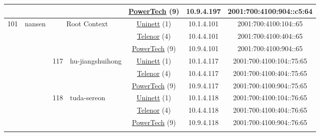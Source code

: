 \begin{small}
\begin{center}
\begin{longtable}{|c|c|c|c|c|c|c|c|}
  &  &  &  & \multicolumn{2}{|c|}{\tiny{\href{http://www.powertech.no}{PowerTech} (9)}} & \tiny{10.9.4.197} & \tiny{2001:700:4100:904::c5:64} \\ \hline
 \multirow{36}{*}{\tiny{101}} & \multicolumn{1}{|l|}{\multirow{36}{*}{\tiny{nansen}}} & \multicolumn{2}{|c|}{\multirow{3}{*}{\tiny{Root Context}}} & \multicolumn{2}{|c|}{\tiny{\href{https://www.uninett.no}{Uninett} (1)}} & \tiny{10.1.4.101} & \tiny{2001:700:4100:104::65} \\* \cline{5-5}\cline{6-6}\cline{7-7}\cline{8-8}
  &  & \multicolumn{2}{|c|}{} & \multicolumn{2}{|c|}{\tiny{\href{https://www.telenor.no}{Telenor} (4)}} & \tiny{10.4.4.101} & \tiny{2001:700:4100:404::65} \\* \cline{5-5}\cline{6-6}\cline{7-7}\cline{8-8}
  &  & \multicolumn{2}{|c|}{} & \multicolumn{2}{|c|}{\tiny{\href{http://www.powertech.no}{PowerTech} (9)}} & \tiny{10.9.4.101} & \tiny{2001:700:4100:904::65} \\* \cline{3-3}\cline{4-4}\cline{5-5}\cline{6-6}\cline{7-7}\cline{8-8}
  &  & \multirow{3}{*}{\tiny{117}} & \multicolumn{1}{|l|}{\multirow{3}{*}{\tiny{hu-jiangshuihong}}} & \multicolumn{2}{|c|}{\tiny{\href{https://www.uninett.no}{Uninett} (1)}} & \tiny{10.1.4.117} & \tiny{2001:700:4100:104::75:65} \\* \cline{5-5}\cline{6-6}\cline{7-7}\cline{8-8}
  &  &  &  & \multicolumn{2}{|c|}{\tiny{\href{https://www.telenor.no}{Telenor} (4)}} & \tiny{10.4.4.117} & \tiny{2001:700:4100:404::75:65} \\* \cline{5-5}\cline{6-6}\cline{7-7}\cline{8-8}
  &  &  &  & \multicolumn{2}{|c|}{\tiny{\href{http://www.powertech.no}{PowerTech} (9)}} & \tiny{10.9.4.117} & \tiny{2001:700:4100:904::75:65} \\* \cline{3-3}\cline{4-4}\cline{5-5}\cline{6-6}\cline{7-7}\cline{8-8}
  &  & \multirow{3}{*}{\tiny{118}} & \multicolumn{1}{|l|}{\multirow{3}{*}{\tiny{tuda-sereon}}} & \multicolumn{2}{|c|}{\tiny{\href{https://www.uninett.no}{Uninett} (1)}} & \tiny{10.1.4.118} & \tiny{2001:700:4100:104::76:65} \\* \cline{5-5}\cline{6-6}\cline{7-7}\cline{8-8}
  &  &  &  & \multicolumn{2}{|c|}{\tiny{\href{https://www.telenor.no}{Telenor} (4)}} & \tiny{10.4.4.118} & \tiny{2001:700:4100:404::76:65} \\* \cline{5-5}\cline{6-6}\cline{7-7}\cline{8-8}
  &  &  &  & \multicolumn{2}{|c|}{\tiny{\href{http://www.powertech.no}{PowerTech} (9)}} & \tiny{10.9.4.118} & \tiny{2001:700:4100:904::76:65} \\* \cline{3-3}\cline{4-4}\cline{5-5}\cline{6-6}\cline{7-7}\cline{8-8}

\end{longtable}
\end{center}
\end{small}
